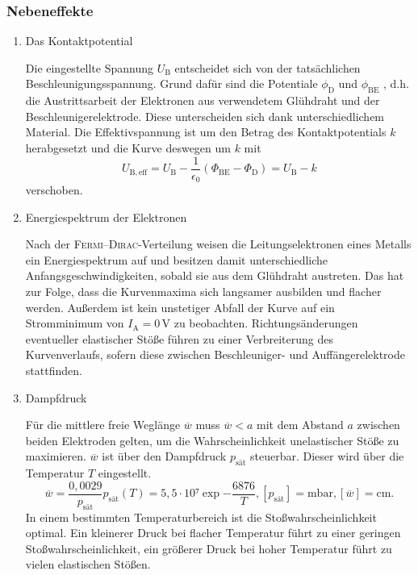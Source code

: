 \subsubsection{Nebeneffekte}
\begin{enumerate}
\item{Das Kontaktpotential}

Die eingestellte Spannung $U_\mathup{B}$ entscheidet sich von der tatsächlichen Beschleunigungsspannung. 
Grund dafür sind die Potentiale $\phi_\mathup{D}$ und $\phi_\mathup{BE}$ , d.h. die Austrittsarbeit der Elektronen aus verwendetem Glühdraht und der Beschleunigerelektrode. 
Diese unterscheiden sich dank unterschiedlichem Material.
Die Effektivspannung ist um den Betrag des Kontaktpotentials $k$ herabgesetzt und die Kurve deswegen um $k$ mit
\begin{equation}
	U_\mathup{B,eff}=U_\mathup{B}-\frac{1}{\epsilon_0}(\Phi_\mathup{BE}-\Phi_\mathup{D})=U_\mathup{B}-k
\end{equation}
verschoben.
\item{Energiespektrum der Elektronen}

Nach der \textsc{Fermi}--\textsc{Dirac}-Verteilung weisen die Leitungselektronen eines Metalls ein Energiespektrum auf und besitzen damit unterschiedliche Anfangsgeschwindigkeiten, sobald sie aus dem Glühdraht austreten.
Das hat zur Folge, dass die Kurvenmaxima sich langsamer ausbilden und flacher werden. 
Außerdem ist kein unstetiger Abfall der Kurve auf ein Stromminimum von $I_\mathup{A}=0\,\si\volt$ zu beobachten.
Richtungsänderungen eventueller elastischer Stöße führen zu einer Verbreiterung des Kurvenverlaufs, sofern diese zwischen Beschleuniger- und Auffängerelektrode stattfinden. 
\item{Dampfdruck}

Für die mittlere freie Weglänge $\overline{w}$ muss $\overline{w} < a$ mit dem Abstand $a$ zwischen beiden Elektroden gelten, um die Wahrscheinlichkeit unelastischer Stöße zu maximieren. 
$\overline{w}$ ist über den Dampfdruck $p_\mathup{sät}$ steuerbar. Dieser wird über die Temperatur $T$ eingestellt. 
\begin{equation}
	\overline{w}=\frac{0,0029}{p_\mathup{sät}}
	p_\mathup{sät}(T)=5,5\cdot 10⁷\exp{-\frac{6876}{T}}, [p_\mathup{sät}]=\si{\milli\bar}, [\overline{w}]=\si{\centi\meter}.
\end{equation}
In einem bestimmten Temperaturbereich ist die Stoßwahrscheinlichkeit optimal.
Ein kleinerer Druck bei flacher Temperatur führt zu einer geringen Stoßwahrscheinlichkeit, ein größerer Druck bei hoher Temperatur führt zu vielen elastischen Stößen.
\end{enumerate}
